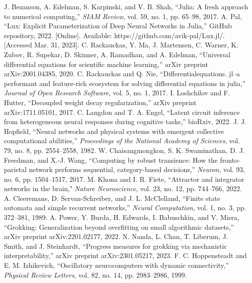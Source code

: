 \documentclass[conference]{IEEEtran}
\begin{document}
\begin{thebibliography}{00}
 J. Bezanson, A. Edelman, S. Karpinski, and V. B. Shah, ``Julia: A fresh approach to numerical computing,'' \textit{SIAM Review}, vol. 59, no. 1, pp. 65--98, 2017.
 A. Pal, ``Lux: Explicit Parameterization of Deep Neural Networks in Julia,'' GitHub repository, 2022. [Online]. Available: https://github.com/avik-pal/Lux.jl/. [Accessed Mar. 31, 2023].
 C. Rackauckas, Y. Ma, J. Martensen, C. Warner, K. Zubov, R. Supekar, D. Skinner, A. Ramadhan, and A. Edelman, ``Universal differential equations for scientific machine learning,'' arXiv preprint arXiv:2001.04385, 2020.
 C. Rackauckas and Q. Nie, ``Differentialequations. jl--a performant and feature-rich ecosystem for solving differential equations in julia,'' \textit{Journal of Open Research Software}, vol. 5, no. 1, 2017.
 I. Loshchilov and F. Hutter, ``Decoupled weight decay regularization,'' arXiv preprint arXiv:1711.05101, 2017.
 C. Langdon and T. A. Engel, ``Latent circuit inference from heterogeneous neural responses during cognitive tasks,'' bioRxiv, 2022.
 J. J. Hopfield, ``Neural networks and physical systems with emergent collective computational abilities,'' \textit{Proceedings of the National Academy of Sciences}, vol. 79, no. 8, pp. 2554--2558, 1982.
 W. Chaisangmongkon, S. K. Swaminathan, D. J. Freedman, and X.-J. Wang, ``Computing by robust transience: How the fronto-parietal network performs sequential, category-based decisions,'' \textit{Neuron}, vol. 93, no. 6, pp. 1504--1517, 2017.
 M. Khona and I. R. Fiete, ``Attractor and integrator networks in the brain," \textit{Nature Neuroscience}, vol. 23, no. 12, pp. 744--766, 2022.
 A. Cleeremans, D. Servan-Schreiber, and J. L. McClelland, ``Finite state automata and simple recurrent networks,'' \textit{Neural Computation}, vol. 1, no. 3, pp. 372--381, 1989.
 A. Power, Y. Burda, H. Edwards, I. Babuschkin, and V. Misra, ``Grokking: Generalization beyond overfitting on small algorithmic datasets,'' arXiv preprint arXiv:2201.02177, 2022.
 N. Nanda, L. Chan, T. Liberum, J. Smith, and J. Steinhardt, ``Progress measures for grokking via mechanistic interpretability,'' arXiv preprint arXiv:2301.05217, 2023.
 F. C. Hoppensteadt and E. M. Izhikevich, ``Oscillatory neurocomputers with dynamic connectivity,'' \textit{Physical Review Letters}, vol. 82, no. 14, pp. 2983--2986, 1999.

\end{thebibliography}
\end{document}
